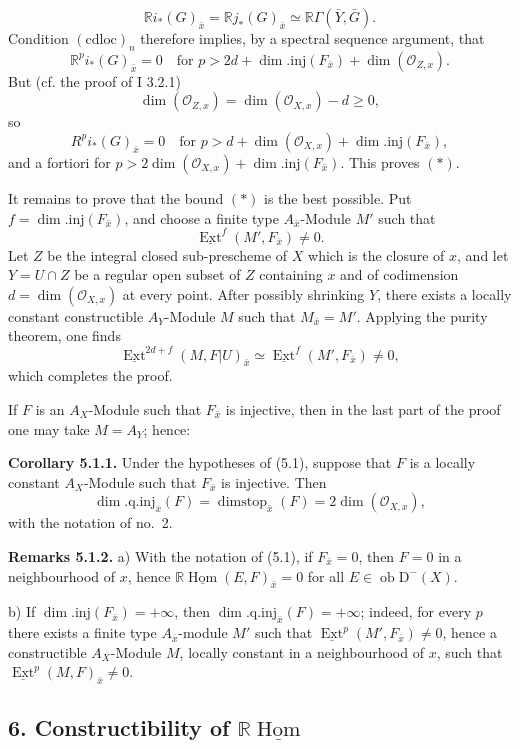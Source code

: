 \documentclass[11pt]{article}
\DeclareMathOperator{\Hom}{Hom}
\DeclareMathOperator{\Ext}{Ext}
\newcommand{\D}{\mathrm{D}}
\newcommand{\ob}{\operatorname{ob}}
\providecommand{\Hom}{\operatorname{Hom}}
\providecommand{\ob}{\operatorname{ob}}
\providecommand{\Hom}{\operatorname{Hom}}
\begin{document}
\[
        \mathbb{R} i_*(G)_{\bar{x}}=\mathbb{R} j_*(G)_{\bar{x}}\simeq \mathbb{R}\Gamma(\bar{Y},\bar{G}).
\]
Condition $(\mathrm{cdloc})_n$ therefore implies, by a spectral sequence argument, that
\[
        \mathbb{R}^p i_*(G)_{\bar{x}}=0\quad\text{for }p>2d+\dim.\mathrm{inj}(F_{\bar{x}})+\dim(\mathcal{O}_{Z,x}).
\]
But (cf. the proof of I 3.2.1)
\[
        \dim(\mathcal{O}_{Z,x})=\dim(\mathcal{O}_{X,x})-d\geq0,
\]
so
\[
        R^p i_*(G)_{\bar{x}}=0\quad\text{for }p>d+\dim(\mathcal{O}_{X,x})+\dim.\mathrm{inj}(F_{\bar{x}}),
\]
and a fortiori for $p>2\dim(\mathcal{O}_{X,x})+\dim.\mathrm{inj}(F_{\bar{x}})$. This proves $(*)$.

It remains to prove that the bound $(*)$ is the best possible. Put $f=\dim.\mathrm{inj}(F_{\bar{x}})$, and choose a finite type $A_{\bar{x}}$-Module $M'$ such that
\[
        \underline{\Ext}^f(M',F_{\bar{x}})\neq0.
\]
Let $Z$ be the integral closed sub-prescheme of $X$ which is the closure of $x$, and let $Y=U\cap Z$ be a regular open subset of $Z$ containing $x$ and of codimension $d=\dim(\mathcal{O}_{X,x})$ at every point. After possibly shrinking $Y$, there exists a locally constant constructible $A_Y$-Module $M$ such that $M_{\bar{x}}=M'$. Applying the purity theorem, one finds
\[
        \underline{\Ext}^{2d+f}(M,F|U)_{\bar{x}}\simeq \underline{\Ext}^f(M',F_{\bar{x}})\neq0,
\]
which completes the proof.

If $F$ is an $A_X$-Module such that $F_{\bar{x}}$ is injective, then in the last part of the proof one may take $M=A_Y$; hence:

\textbf{Corollary 5.1.1.} Under the hypotheses of (5.1), suppose that $F$ is a locally constant $A_X$-Module such that $F_{\bar{x}}$ is injective. Then
\[
        \dim.\mathrm{q.inj}_{\bar{x}}(F)=\operatorname{dimstop}_{\bar{x}}(F)=2\dim(\mathcal{O}_{X,x}),
\]
with the notation of no.~2.

\textbf{Remarks 5.1.2.} a) With the notation of (5.1), if $F_{\bar{x}}=0$, then $F=0$ in a neighbourhood of $x$, hence $\mathbb{R}\underline{\Hom}(E,F)_{\bar{x}}=0$ for all $E\in\ob\D^{-}(X)$.

b) If $\dim.\mathrm{inj}(F_{\bar{x}})=+\infty$, then $\dim.\mathrm{q.inj}_{\bar{x}}(F)=+\infty$; indeed, for every $p$ there exists a finite type $A_{\bar{x}}$-module $M'$ such that $\underline{\Ext}^p(M',F_{\bar{x}})\neq0$, hence a constructible $A_X$-Module $M$, locally constant in a neighbourhood of $x$, such that $\underline{\Ext}^p(M,F)_{\bar{x}}\neq0$.

\subsection*{6. Constructibility of $\mathbb{R}\underline{\Hom}$}
\end{document}
